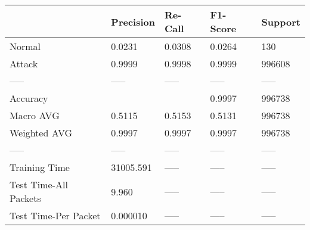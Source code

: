 \begin{tabular}{lllll}
\toprule
{} &  Precision & Re-Call & F1-Score & Support \\
\midrule
Normal                &     0.0231 &  0.0308 &   0.0264 &     130 \\
Attack                &     0.9999 &  0.9998 &   0.9999 &  996608 \\
-----                 &      ----- &   ----- &    ----- &   ----- \\
Accuracy              &            &         &   0.9997 &  996738 \\
Macro AVG             &     0.5115 &  0.5153 &   0.5131 &  996738 \\
Weighted AVG          &     0.9997 &  0.9997 &   0.9997 &  996738 \\
-----                 &      ----- &   ----- &    ----- &   ----- \\
Training Time         &  31005.591 &   ----- &    ----- &   ----- \\
Test Time-All Packets &      9.960 &   ----- &    ----- &   ----- \\
Test Time-Per Packet  &   0.000010 &   ----- &    ----- &   ----- \\
\bottomrule
\end{tabular}
